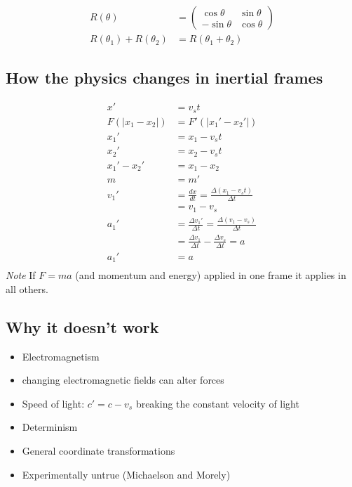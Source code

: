 \documentclass[12pt,letterpaper, twocolumn]{article}
\begin{document}
\begin{itemize}
\begin{align*}
        R(\theta) &=\begin{pmatrix}\cos\theta&\sin\theta\\-\sin\theta&\cos\theta\end{pmatrix}\\
        R(\theta_1) + R(\theta_2) &= R(\theta_1+\theta_2)
      \end{align*}
\end{itemize}

\subsection{How the physics changes in inertial frames}
\begin{align*}
    x'&={v_s}t\\
    F(|x_1-x_2|) &= F'(|x_1'-x_2'|)\\
    x_1' &= x_1-{v_s}t\\
    x_2' &= x_2-{v_s}t\\
    x_1' - x_2' &= x_1 - x_2\\
    m &= m'\\
    v_1' &= \frac{dx}{dt} = \frac{\Delta(x_1-{v_s}t)}{\Delta t}\\
    &= v_1-v_s\\
    a_1' &= \frac{\Delta v_1'}{\Delta t} = \frac{\Delta (v_1-v_s)}{\Delta t}\\
    &=\frac{\Delta v_1}{\Delta t} - \frac{\Delta v_s}{\Delta t} = a\\
    a_1' &= a\\
\end{align*}
\textit{Note} If $F=ma$ (and momentum and energy) applied in one frame it applies in all others. 

\subsection{Why it doesn't work}
\begin{itemize}
    \item Electromagnetism
        \item changing electromagnetic fields can alter forces
        \item Speed of light: $c' = c-v_s$ breaking the constant velocity of light
    \item Determinism
    \item General coordinate transformations
    \item Experimentally untrue (Michaelson and Morely)
\end{itemize}
\end{document}
